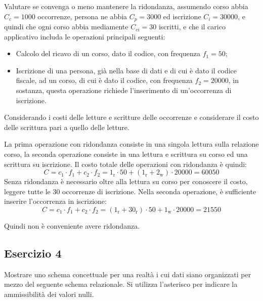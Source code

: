 \documentclass{article}
\numberwithin{equation}{subsection}
\begin{document}
Valutare se convenga o meno mantenere la ridondanza, assumendo corso abbia $C_c=1000$ occorrenze, persona ne abbia $C_p=3000$ ed iscrizione 
$C_i=30000$, e quindi che ogni corso abbia mediamente $C_{ci}=30$ iscritti, e che il carico applicativo includa le operazioni principali seguenti:
\begin{itemize}
    \item Calcolo del ricavo di un corso, dato il codice, con frequenza $f_1=50$;
    \item Iscrizione di una persona, già nella base di dati e di cui è dato il codice fiscale, ad un corso, di cui è dato il codice, con 
    frequenza $f_2=20000$, in sostanza, questa operazione richiede l'inserimento di un'occorrenza di iscrizione. 
\end{itemize}

Considerando i costi delle letture e scritture delle occorrenze e considerare il costo delle scrittura pari a quello delle letture. 


La prima operazione con ridondanza consiste in una singola lettura sulla relazione corso, la seconda operazione consiste in una 
lettura e scrittura su corso ed una scrittura su iscrizione. Il costo totale delle operazioni con ridondanza è quindi:
\begin{equation*}
    C=c_1\cdot f_1+c_2\cdot f_2=1_{\mathrm{r}}\cdot50+(1_{\mathrm{r}}+2_{\mathrm{w}})\cdot20000=60050
\end{equation*}
Senza ridondanza è necessario oltre alla lettura su corso per conoscere il costo, leggere tutte le 30 occorrenze di iscrizione. Nella seconda operazione, 
è sufficiente inserire l'occorrenza in iscrizione:
\begin{equation*}
    C=c_1\cdot f_1+c_2\cdot f_2=(1_{\mathrm{r}}+30_\mathrm{r})\cdot50+1_\mathrm{w}\cdot20000=21550
\end{equation*}

Quindi non è conveniente avere ridondanza. 

\subsection{Esercizio 4}

Mostrare uno schema concettuale per una realtà i cui dati siano organizzati per mezzo del seguente 
schema relazionale. Si utilizza l'asterisco per indicare la ammissibilità dei valori nulli.
\end{document}
